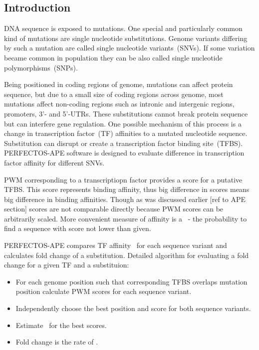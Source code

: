 \subsection{Introduction}
DNA sequence is exposed to mutations. One special and particularly common kind of mutations are single nucleotide substitutions. Genome variants differing by such a mutation are called single nucleotide variants~(SNVs). If some variation became common in population they can be also called single nucleotide polymorphisms~(SNPs).

Being positioned in coding regions of genome, mutations can affect protein sequence, but due to a small size of coding regions across genome, most mutations affect non-coding regions such as intronic and intergenic regions, promoters, 3'- and 5'-UTRs. These substitutions cannot break protein sequence but can interfere gene regulation. One possible mechanism of this process is a change in transcription factor~(TF) affinities to a mutated nucleotide sequence. Substitution can disrupt or create a transcription factor binding site~(TFBS). PERFECTOS-APE software is designed to evaluate difference in transcription factor affinity for different SNVs.

PWM corresponding to a transcriptiopn factor provides a score for a putative TFBS. This score represents binding affinity, thus big difference in scores means big difference in binding affinities. Though as was discussed earlier [ref to APE section] scores are not comparable directly because PWM scores can be arbitrarily scaled. More convenient measure of affinity is a \pvalue\ - the probability to find a sequence with score not lower than given.

PERFECTOS-APE compares TF affinity \pvalues\ for each sequence variant and calculates fold change of a substitution. Detailed algorithm for evaluating a fold change for a given TF and a substituion:

\begin{itemize}
\item For each genome position such that corresponding TFBS overlaps mutation position calculate PWM scores for each sequence variant.
\item Independently choose the best position and score for both sequence variants.
\item Estimate \pvalues\ for the best scores.
\item Fold change is the rate of \pvalues.
\end{itemize}

